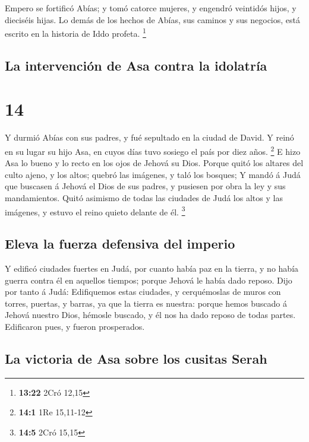  Empero se fortificó Abías; y tomó catorce mujeres, y
engendró veintidós hijos, y dieciséis hijas.  Lo demás de
los hechos de Abías, sus caminos y sus negocios, está escrito en la
historia de Iddo profeta. \footnote{\textbf{13:22} 2Cró 12,15}

\hypertarget{la-intervenciuxf3n-de-asa-contra-la-idolatruxeda}{%
\subsection{La intervención de Asa contra la
idolatría}\label{la-intervenciuxf3n-de-asa-contra-la-idolatruxeda}}

\hypertarget{section-13}{%
\section{14}\label{section-13}}

 Y durmió Abías con sus padres, y fué sepultado en la
ciudad de David. Y reinó en su lugar su hijo Asa, en cuyos días tuvo
sosiego el país por diez años. \footnote{\textbf{14:1} 1Re 15,11-12}
 E hizo Asa lo bueno y lo recto en los ojos de Jehová su
Dios.  Porque quitó los altares del culto ajeno, y los
altos; quebró las imágenes, y taló los bosques;  Y mandó á
Judá que buscasen á Jehová el Dios de sus padres, y pusiesen por obra la
ley y sus mandamientos.  Quitó asimismo de todas las
ciudades de Judá los altos y las imágenes, y estuvo el reino quieto
delante de él. \footnote{\textbf{14:5} 2Cró 15,15}

\hypertarget{eleva-la-fuerza-defensiva-del-imperio}{%
\subsection{Eleva la fuerza defensiva del
imperio}\label{eleva-la-fuerza-defensiva-del-imperio}}

 Y edificó ciudades fuertes en Judá, por cuanto había paz
en la tierra, y no había guerra contra él en aquellos tiempos; porque
Jehová le había dado reposo.  Dijo por tanto á Judá:
Edifiquemos estas ciudades, y cerquémoslas de muros con torres, puertas,
y barras, ya que la tierra es nuestra: porque hemos buscado á Jehová
nuestro Dios, hémosle buscado, y él nos ha dado reposo de todas partes.
Edificaron pues, y fueron prosperados.

\hypertarget{la-victoria-de-asa-sobre-los-cusitas-serah}{%
\subsection{La victoria de Asa sobre los cusitas
Serah}\label{la-victoria-de-asa-sobre-los-cusitas-serah}}

